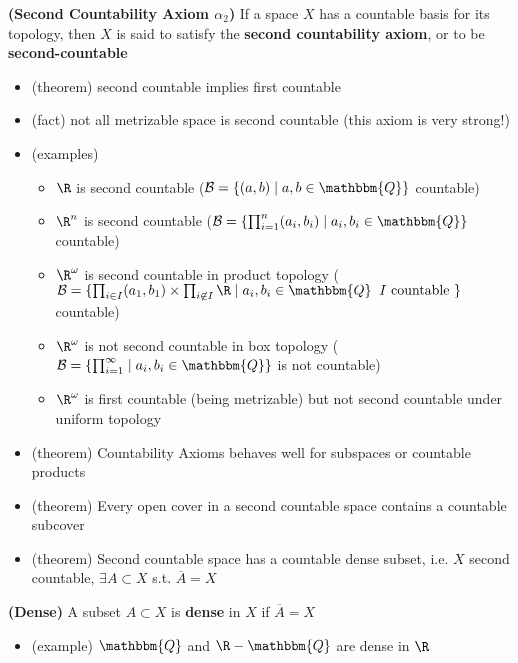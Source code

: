 \documentclass[10.5pt]{article}
\newcommand{\calB}{\mathcal{B}}
\newcommand{\Q}{\mathbbm{Q}}
\begin{document}
\begin{defn*}
    \textbf{(Second Countability Axiom $\alpha_2$)} If a space $X$ has a countable basis for its topology, then $X$ is said to satisfy the \textbf{second countability axiom}, or to be \textbf{second-countable}
    \begin{itemize}
        \item (theorem) second countable implies first countable
        \item (fact) not all metrizable space is second countable (this axiom is very strong!)
        \item (examples)
        \begin{itemize}
            \item $\R$ is second countable ($\calB = \{(a,b)\mid a,b\in \Q\}$ countable)
            \item $\R^n$ is second countable ($\calB = \{ \textstyle\prod_{i=1}^n (a_i, b_i) \mid a_i,b_i \in\Q \}$ countable)
            \item $\R^{\omega}$ is second countable in product topology ($\textstyle \calB = \{ \prod_{i\in I} (a_1, b_1) \times \prod_{i\not\in I} \R \mid a_i, b_i \in\Q \;\; I \text{ countable }\}$ countable)
            \item $\R^{\omega}$ is not second countable in box topology ($\textstyle \calB = \{ \prod_{i=1}^{\infty} \mid a_i,b_i\in\Q \}$ is not countable)
            \item $\R^{\omega}$ is first countable (being metrizable) but not second countable under uniform topology
        \end{itemize}
        \item (theorem) Countability Axioms behaves well for subspaces or countable products
        \item (theorem) Every open cover in a second countable space contains a countable subcover
        \item (theorem) Second countable space has a countable dense subset, i.e. $X$ second countable, $\exists A\subset X$ s.t. $\overline{A}=X$
    \end{itemize}
\end{defn*}

\begin{defn*}
    \textbf{(Dense)} A subset $A\subset X$ is \textbf{dense} in $X$ if $\overline{A} = X$ 
    \begin{itemize}
        \item (example) $\Q$ and $\R-\Q$ are dense in $\R$
    \end{itemize}
\end{defn*}
\end{document}
